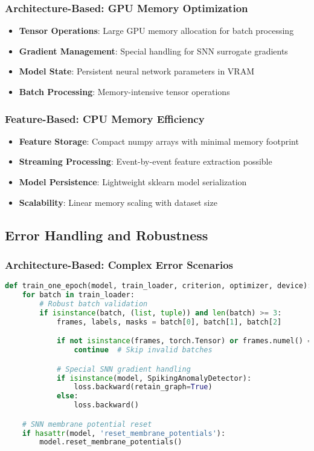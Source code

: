 \documentclass[11pt,a4paper]{article}
\begin{document}
\subsubsection{Architecture-Based: GPU Memory Optimization}
\begin{itemize}
    \item \textbf{Tensor Operations}: Large GPU memory allocation for batch processing
    \item \textbf{Gradient Management}: Special handling for SNN surrogate gradients
    \item \textbf{Model State}: Persistent neural network parameters in VRAM
    \item \textbf{Batch Processing}: Memory-intensive tensor operations
\end{itemize}

\subsubsection{Feature-Based: CPU Memory Efficiency}
\begin{itemize}
    \item \textbf{Feature Storage}: Compact numpy arrays with minimal memory footprint
    \item \textbf{Streaming Processing}: Event-by-event feature extraction possible
    \item \textbf{Model Persistence}: Lightweight sklearn model serialization
    \item \textbf{Scalability}: Linear memory scaling with dataset size
\end{itemize}

\subsection{Error Handling and Robustness}

\subsubsection{Architecture-Based: Complex Error Scenarios}
\begin{lstlisting}[language=Python, caption=Architecture-Based Error Handling]
def train_one_epoch(model, train_loader, criterion, optimizer, device):
    for batch in train_loader:
        # Robust batch validation
        if isinstance(batch, (list, tuple)) and len(batch) >= 3:
            frames, labels, masks = batch[0], batch[1], batch[2]

            if not isinstance(frames, torch.Tensor) or frames.numel() == 0:
                continue  # Skip invalid batches

            # Special SNN gradient handling
            if isinstance(model, SpikingAnomalyDetector):
                loss.backward(retain_graph=True)
            else:
                loss.backward()

    # SNN membrane potential reset
    if hasattr(model, 'reset_membrane_potentials'):
        model.reset_membrane_potentials()
\end{lstlisting}
\end{document}
